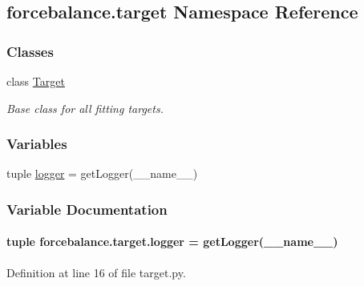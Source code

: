 \hypertarget{namespaceforcebalance_1_1target}{\subsection{forcebalance.\-target Namespace Reference}
\label{namespaceforcebalance_1_1target}
}
\subsubsection*{Classes}
\begin{DoxyCompactItemize}
\item 
class \hyperlink{classforcebalance_1_1target_1_1Target}{Target}
\begin{DoxyCompactList}\small\item\em Base class for all fitting targets. \end{DoxyCompactList}\end{DoxyCompactItemize}
\subsubsection*{Variables}
\begin{DoxyCompactItemize}
\item 
tuple \hyperlink{namespaceforcebalance_1_1target_a976b578b7936f7ef8f929a98f3979bd7}{logger} = get\-Logger(\-\_\-\-\_\-name\-\_\-\-\_\-)
\end{DoxyCompactItemize}


\subsubsection{Variable Documentation}
\hypertarget{namespaceforcebalance_1_1target_a976b578b7936f7ef8f929a98f3979bd7}{
\paragraph[{logger}]{\setlength{\rightskip}{0pt plus 5cm}tuple forcebalance.\-target.\-logger = get\-Logger(\-\_\-\-\_\-name\-\_\-\-\_\-)}}\label{namespaceforcebalance_1_1target_a976b578b7936f7ef8f929a98f3979bd7}


Definition at line 16 of file target.\-py.


